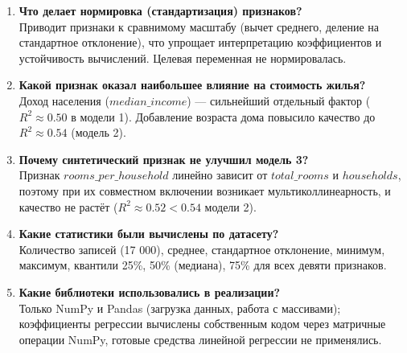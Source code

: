 \documentclass[12pt,a4paper]{article}
\begin{document}
\begin{enumerate}
\item \textbf{Что делает нормировка (стандартизация) признаков?}\\
Приводит признаки к сравнимому масштабу (вычет среднего, деление на стандартное отклонение), что упрощает интерпретацию коэффициентов и устойчивость вычислений. Целевая переменная не нормировалась.

\item \textbf{Какой признак оказал наибольшее влияние на стоимость жилья?}\\
Доход населения ($median\_income$) --- сильнейший отдельный фактор ($R^2 \approx 0.50$ в модели 1). Добавление возраста дома повысило качество до $R^2 \approx 0.54$ (модель 2).

\item \textbf{Почему синтетический признак не улучшил модель 3?}\\
Признак $rooms\_per\_household$ линейно зависит от $total\_rooms$ и $households$, поэтому при их совместном включении возникает мультиколлинеарность, и качество не растёт ($R^2 \approx 0.52 < 0.54$ модели 2).

\item \textbf{Какие статистики были вычислены по датасету?}\\
Количество записей (17 000), среднее, стандартное отклонение, минимум, максимум, квантили 25\%, 50\% (медиана), 75\% для всех девяти признаков.

\item \textbf{Какие библиотеки использовались в реализации?}\\
Только NumPy и Pandas (загрузка данных, работа с массивами); коэффициенты регрессии вычислены собственным кодом через матричные операции NumPy, готовые средства линейной регрессии не применялись.
\end{enumerate}
\end{document}
